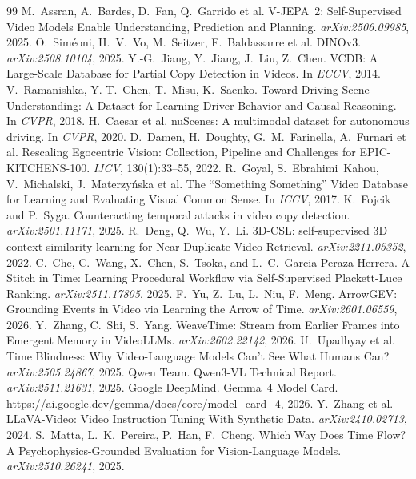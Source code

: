 \documentclass{article}
\theoremstyle{remark}
\begin{document}
\begin{thebibliography}{99}
 M.~Assran, A.~Bardes, D.~Fan, Q.~Garrido et al. V-JEPA~2: Self-Supervised Video Models Enable Understanding, Prediction and Planning. \emph{arXiv:2506.09985}, 2025.
 O.~Sim\'{e}oni, H.~V.~Vo, M.~Seitzer, F.~Baldassarre et al. DINOv3. \emph{arXiv:2508.10104}, 2025.
 Y.-G.~Jiang, Y.~Jiang, J.~Liu, Z.~Chen. VCDB: A Large-Scale Database for Partial Copy Detection in Videos. In \emph{ECCV}, 2014.
 V.~Ramanishka, Y.-T.~Chen, T.~Misu, K.~Saenko. Toward Driving Scene Understanding: A Dataset for Learning Driver Behavior and Causal Reasoning. In \emph{CVPR}, 2018.
 H.~Caesar et al. nuScenes: A multimodal dataset for autonomous driving. In \emph{CVPR}, 2020.
 D.~Damen, H.~Doughty, G.~M.~Farinella, A.~Furnari et al. Rescaling Egocentric Vision: Collection, Pipeline and Challenges for EPIC-KITCHENS-100. \emph{IJCV}, 130(1):33--55, 2022.
 R.~Goyal, S.~Ebrahimi~Kahou, V.~Michalski, J.~Materzy\'nska et al. The ``Something Something'' Video Database for Learning and Evaluating Visual Common Sense. In \emph{ICCV}, 2017.
 K.~Fojcik and P.~Syga. Counteracting temporal attacks in video copy detection. \emph{arXiv:2501.11171}, 2025.
 R.~Deng, Q.~Wu, Y.~Li. 3D-CSL: self-supervised 3D context similarity learning for Near-Duplicate Video Retrieval. \emph{arXiv:2211.05352}, 2022.
 C.~Che, C.~Wang, X.~Chen, S.~Tsoka, and L.~C.~Garcia-Peraza-Herrera. A Stitch in Time: Learning Procedural Workflow via Self-Supervised Plackett-Luce Ranking. \emph{arXiv:2511.17805}, 2025.
 F.~Yu, Z.~Lu, L.~Niu, F.~Meng. ArrowGEV: Grounding Events in Video via Learning the Arrow of Time. \emph{arXiv:2601.06559}, 2026.
 Y.~Zhang, C.~Shi, S.~Yang. WeaveTime: Stream from Earlier Frames into Emergent Memory in VideoLLMs. \emph{arXiv:2602.22142}, 2026.
 U.~Upadhyay et al. Time Blindness: Why Video-Language Models Can't See What Humans Can? \emph{arXiv:2505.24867}, 2025.
 Qwen Team. Qwen3-VL Technical Report. \emph{arXiv:2511.21631}, 2025.
 Google DeepMind. Gemma~4 Model Card. \url{https://ai.google.dev/gemma/docs/core/model_card_4}, 2026.
 Y.~Zhang et al. LLaVA-Video: Video Instruction Tuning With Synthetic Data. \emph{arXiv:2410.02713}, 2024.
 S.~Matta, L.~K.~Pereira, P.~Han, F.~Cheng. Which Way Does Time Flow? A Psychophysics-Grounded Evaluation for Vision-Language Models. \emph{arXiv:2510.26241}, 2025.

\end{thebibliography}
\end{document}
